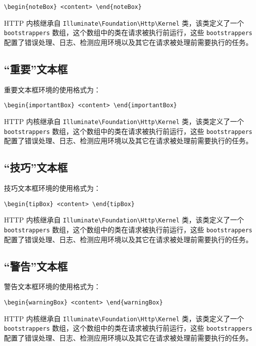 \documentclass{nwafucoursepaper}
\begin{document}
\verb|\begin{noteBox} <content> \end{noteBox}|

\begin{noteBox}
  HTTP 内核继承自 \verb|Illuminate\Foundation\Http\Kernel| 类，该类定义了一个 \verb|bootstrappers| 数组，这个数组中的类在请求被执行前运行，这些 \verb|bootstrappers| 配置了错误处理、日志、检测应用环境以及其它在请求被处理前需要执行的任务。
\end{noteBox}

\subsection{\enquote{重要}文本框}
重要文本框环境的使用格式为：

\verb|\begin{importantBox} <content> \end{importantBox}|

\begin{importantBox}
  HTTP 内核继承自 \verb|Illuminate\Foundation\Http\Kernel| 类，该类定义了一个 \verb|bootstrappers| 数组，这个数组中的类在请求被执行前运行，这些 \verb|bootstrappers| 配置了错误处理、日志、检测应用环境以及其它在请求被处理前需要执行的任务。
\end{importantBox}
\subsection{\enquote{技巧}文本框}
技巧文本框环境的使用格式为：

\verb|\begin{tipBox} <content> \end{tipBox}|

\begin{tipBox}
  HTTP 内核继承自 \verb|Illuminate\Foundation\Http\Kernel| 类，该类定义了一个 \verb|bootstrappers| 数组，这个数组中的类在请求被执行前运行，这些 \verb|bootstrappers| 配置了错误处理、日志、检测应用环境以及其它在请求被处理前需要执行的任务。
\end{tipBox}
\subsection{\enquote{警告}文本框}
警告文本框环境的使用格式为：

\verb|\begin{warningBox} <content> \end{warningBox}|

\begin{warningBox}
  HTTP 内核继承自 \verb|Illuminate\Foundation\Http\Kernel| 类，该类定义了一个 \verb|bootstrappers| 数组，这个数组中的类在请求被执行前运行，这些 \verb|bootstrappers| 配置了错误处理、日志、检测应用环境以及其它在请求被处理前需要执行的任务。
\end{warningBox}
\end{document}

